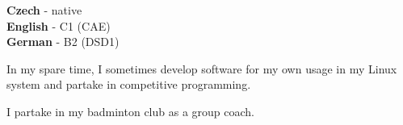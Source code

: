 \documentclass[9pt]{developercv} %
\begin{document}
\begin{minipage}[t]{0.3\textwidth}
	\vspace{-\baselineskip} %

	
	\textbf{Czech} - native\\
	\textbf{English} - C1 (CAE)\\
	\textbf{German} - B2 (DSD1)
\end{minipage}
\hfill
\begin{minipage}[t]{0.3\textwidth}
	\vspace{-\baselineskip} %
	
	
	In my spare time, I sometimes develop software for my own usage in my Linux system and partake in competitive programming.
\end{minipage}
\hfill
\begin{minipage}[t]{0.3\textwidth}
	\vspace{-\baselineskip} %
	
	
	I partake in my badminton club as a group coach.
\end{minipage}

\end{document}
